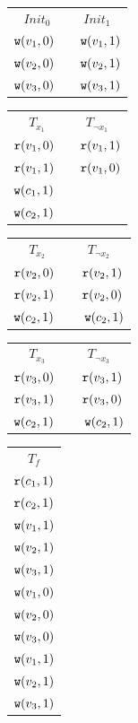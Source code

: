 \begin{table}[h]
    
\noindent
\begin{minipage}{0.45\textwidth}
\centering
\begin{tabular}{c | c}
    $Init_0$ & $Init_1$ \\
    $\mathtt{w}(v_1,0)$~& ~$\mathtt{w}(v_1,1)$ \\ 
    $\mathtt{w}(v_2,0)$~& ~$\mathtt{w}(v_2,1)$ \\ 
    $\mathtt{w}(v_3,0)$~& ~$\mathtt{w}(v_3,1)$ \\

\end{tabular}
\vspace{.1cm}

\begin{tabular}{c | c}
    $T_{x_1}$ & $T_{\neg x_1}$ \\
    $\mathtt{r}(v_1,0)$~& ~$\mathtt{r}(v_1,1)$ \\ 
    $\mathtt{r}(v_1,1)$~& ~$\mathtt{r}(v_1,0)$ \\ 
    $\mathtt{w}(c_1, 1)$~& ~ \\
    $\mathtt{w}(c_2,1)$~&~ \\
\end{tabular}
\vspace{.1cm}

\begin{tabular}{c | c}
    $T_{x_2}$ & $T_{\neg x_2}$\\
     $\mathtt{r}(v_2,0)$~& ~$\mathtt{r}(v_2,1)$ \\ 
    $\mathtt{r}(v_2,1)$~& ~$\mathtt{r}(v_2,0)$ \\ 
    $\mathtt{w}(c_2, 1)$~& ~ $\mathtt{w}(c_2,1)$\\
\end{tabular}
\vspace{.1cm}

\begin{tabular}{c | c}
    $T_{x_3}$ & $T_{\neg x_3}$\\
     $\mathtt{r}(v_3,0)$~& ~$\mathtt{r}(v_3,1)$ \\ 
    $\mathtt{r}(v_3,1)$~& ~$\mathtt{r}(v_3,0)$ \\ 
    $\mathtt{w}(c_2, 1)$~& ~ $\mathtt{w}(c_2,1)$\\
   
\end{tabular}

\end{minipage}
\hfill
\begin{minipage}{0.45\textwidth}
\centering
\begin{tabular}{c}
    $T_f$ \\
     $\mathtt{r}(c_1, 1)$ \\
    $\mathtt{r}(c_2, 1)$ \\
    $\mathtt{w}(v_1, 1)$ \\
    $\mathtt{w}(v_2, 1)$ \\
    $\mathtt{w}(v_3, 1)$ \\
    $\mathtt{w}(v_1, 0)$ \\
    $\mathtt{w}(v_2, 0)$ \\
    $\mathtt{w}(v_3, 0)$ \\
    $\mathtt{w}(v_1, 1)$ \\
    $\mathtt{w}(v_2, 1)$ \\
    $\mathtt{w}(v_3, 1)$ \\


\end{tabular}
\end{minipage}
\end{table}
